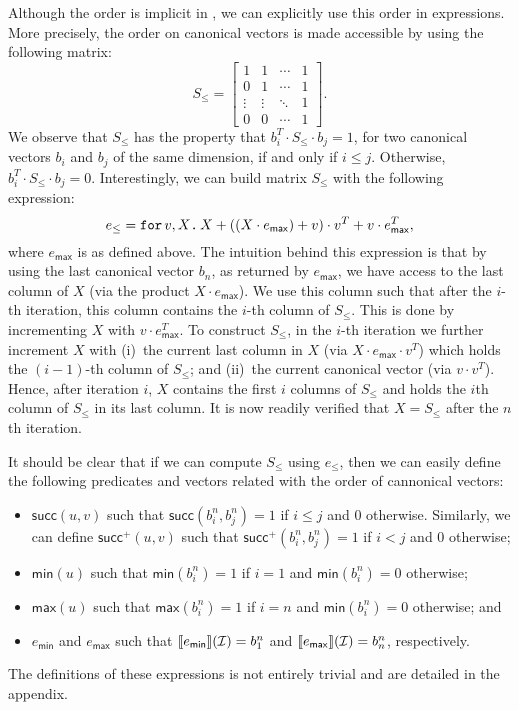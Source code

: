 Although the order is implicit in \langfor, we can explicitly use this order in \langfor expressions. More precisely, the order on canonical vectors is made accessible by
using the following matrix:
\[
S_{\leq} = \begin{bmatrix}
1 & 1 & \cdots &  1 \\
0 & 1 & \cdots & 1\\
\vdots & \vdots & \ddots & 1 \\
0 & 0 & \cdots & 1 
\end{bmatrix}.
\] 
We observe that $S_{\leq}$ has the property that $b_i^T\cdot S_{\leq} \cdot b_j=1$, for two canonical vectors $b_i$ and $b_j$ of the same dimension, if and only if $i\leq j$. Otherwise, $b_i^T\cdot S_{\leq} \cdot b_j=0$. 
Interestingly, we can build matrix $S_{\leq}$ with the following \langfor expression:
$$
e_{\leq}=\texttt{for}\, v,X \texttt{.}\, X + \left((X\cdot e_{\mathsf{max}}) + v \right)\cdot v^T + v\cdot e^T_{\mathsf{max}},
$$
where $e_{\mathsf{max}}$ is as defined above. The intuition behind this expression is that by using the last canonical vector $b_n$, as returned by $e_{\mathsf{max}}$, we have access to the last column of $X$ (via the product $X\cdot e_{\mathsf{max}}$). We use this column such that after the $i$-th iteration, this column contains the $i$-th column of $S_{\leq}$. This is done by incrementing $X$ with $v\cdot e_{\mathsf{max}}^T$.
To construct $S_{\leq}$, in the $i$-th iteration we further increment $X$ with 
(i)~the current last column in $X$ (via $X\cdot e_{\mathsf{max}}\cdot v^T$) which holds
the $(i-1)$-th column of $S_{\leq}$; and (ii)~the current canonical vector (via $v\cdot v^T$). Hence, after iteration $i$, $X$ contains the first $i$ columns of $S_{\leq}$ and holds the $i$th column of $S_{\leq}$ in its last column. It is now readily verified that $X=S_{\leq}$ after the $n$th iteration.

It should be clear that if we can compute $S_{\leq}$ using $e_{\leq}$, then we can easily define the following predicates and vectors related with the order of cannonical vectors:
\begin{itemize}
	\item $\mathsf{succ}(u,v)$ such that $\mathsf{succ}(b_i^n,b_j^n)=1$ if $i\leq j$ and $0$ otherwise. Similarly, we can define
	$\mathsf{succ}^+(u,v)$ such that  $\mathsf{succ}^+(b_i^n,b_j^n)=1$ if $i < j$ and $0$ otherwise;
	\item $\mathsf{min}(u)$ such that  $\mathsf{min}(b_i^n)=1$ if $i=1$ and $\mathsf{min}(b_i^n)=0$ otherwise; 
	\item $\mathsf{max}(u)$ such that  $\mathsf{max}(b_i^n)=1$ if $i=n$ and $\mathsf{min}(b_i^n)=0$ otherwise; and
	\item $e_{\mathsf{min}}$ and $e_{\mathsf{max}}$ such that $\llbracket e_{\mathsf{min}} \rrbracket(\mathcal{I})=b_1^n$ and 
	$\llbracket e_{\mathsf{max}} \rrbracket(\mathcal{I})=b_n^n$, respectively.
\end{itemize}
The definitions of these expressions is not entirely trivial and are detailed in the appendix.

